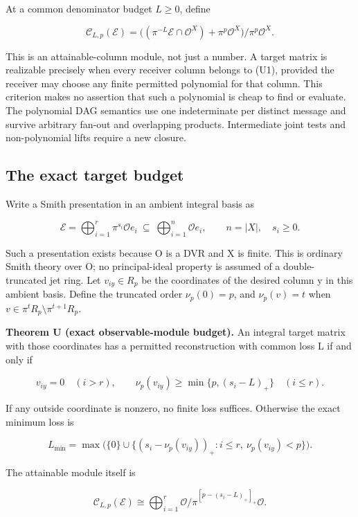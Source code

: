 \documentclass[
  11pt,
]{article}
\begin{document}
At a common denominator budget \(L\ge0\), define

\[
 \mathcal C_{L,p}(\mathcal E)=
 \big((\pi^{-L}\mathcal E\cap\mathcal O^X)+\pi^p\mathcal O^X\big)
                /\pi^p\mathcal O^X. \tag{U1}
\]

This is an attainable-column module, not just a number. A target matrix
is realizable precisely when every receiver column belongs to (U1),
provided the receiver may choose any finite permitted polynomial for
that column. This criterion makes no assertion that such a polynomial is
cheap to find or evaluate. The polynomial DAG semantics use one
indeterminate per distinct message and survive arbitrary fan-out and
overlapping products. Intermediate joint tests and non-polynomial lifts
require a new closure.

\subsection{The exact target budget}\label{v8-the-exact-target-budget}

Write a Smith presentation in an ambient integral basis as

\[
 \mathcal E=\bigoplus_{i=1}^{r}\pi^{s_i}\mathcal O e_i
 \ \subseteq\ \bigoplus_{i=1}^{n}\mathcal O e_i,
 \qquad n=|X|,\quad s_i\ge0. \tag{U2}
\]

Such a presentation exists because O is a DVR and X is finite. This is
ordinary Smith theory over O; no principal-ideal property is assumed of
a double-truncated jet ring. Let \(v_{iy}\in R_p\) be the coordinates of
the desired column y in this ambient basis. Define the truncated order
\(\nu_p(0)=p\), and \(\nu_p(v)=t\) when
\(v\in\pi^tR_p\setminus\pi^{t+1}R_p\).

\textbf{Theorem U (exact observable-module budget).} An integral target
matrix with those coordinates has a permitted reconstruction with common
loss L if and only if

\[
 v_{iy}=0\quad(i>r),\qquad
 \nu_p(v_{iy})\ge\min\{p,(s_i-L)_+\}\quad(i\le r). \tag{U3}
\]

If any outside coordinate is nonzero, no finite loss suffices. Otherwise
the exact minimum loss is

\[
 L_{\min}=\max\bigl(\{0\}\cup
     \{(s_i-\nu_p(v_{iy}))_+:i\le r,\ \nu_p(v_{iy})<p\}\bigr).
 \tag{U4}
\]

The attainable module itself is

\[
 \mathcal C_{L,p}(\mathcal E)\cong
 \bigoplus_{i=1}^{r}
 \mathcal O/\pi^{[p-(s_i-L)_+]_+}\mathcal O. \tag{U5}
\]
\end{document}
